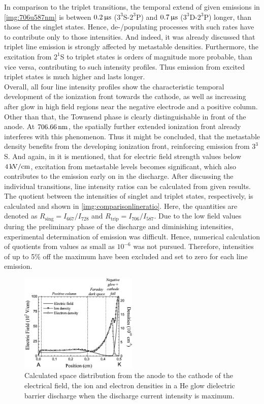 \documentclass[a4paper,10pt,twoside]{article}
\newcommand{\tenpo}[1]{ 10^{#1}}
\newcommand{\ix}[1]{_\text{#1}}
\begin{document}
		 In comparison to the triplet transitions, the temporal extend of given emissions in \autoref{img:706u587nm} is between $\unit[0.2]{\upmu s}$ ($3^3$S-$2^3$P) and $\unit[0.7]{\upmu s}$ ($3^3$D-$2^3$P) longer, than those of the singlet states. Hence, de-/populating processes with such rates have to contribute only to those intensities. And indeed, it was already discussed that triplet line emission is strongly affected by metastable densities. Furthermore, the excitation from $2^1$S to triplet states is orders of magnitude more probable, than vice versa, contributing to such intensity profiles. Thus emission from excited triplet states is much higher and lasts longer.\\
		 Overall, all four line intensity profiles show the characteristic temporal development of the ionization front towards the cathode, as well as increasing after glow in high field regions near the negative electrode and a positive column. Other than that, the Townsend phase is clearly distinguishable in front of the anode. At $\unit[706.66]{nm}$, the spatially further extended ionization front already interferes with this phenomenon. Thus it might be concluded, that the metastable density benefits from the developing ionization front, reinforcing emission from $3^3$S. And again, in \cite{linratio1_14} it is mentioned, that for electric field strength values below $\unit[4]{kV/cm}$, excitation from metastable levels becomes significant, which also contributes to the emission early on in the discharge.
		After discussing the individual transitions, line intensity ratios can be calculated from given results. The quotient between the intensities of singlet and triplet states, respectively, is calculated and shown in \autoref{img:comparisonlineratio}. Here, the quantities are denoted as $R\ix{sing}=I\ix{667}/I\ix{728}$ and $R\ix{trip}=I\ix{706}/I\ix{587}$. Due to the low field values during the preliminary phase of the discharge and diminishing intensities, experimental determination of emission was difficult. Hence, numerical calculation of quotients from values as small as $\tenpo{-6}$ was not pursued. Therefore, intensities of up to 5\% off the maximum have been excluded and set to zero for each line emission.
		
			\begin{figure}[t!]
				\centering
				\includegraphics[width=0.5\textwidth]{figures/lineratio/massinesp3fig5.pdf}
				\caption{Calculated space distribution from the anode to the cathode of	the electrical field, the ion and electron densities in a He glow dielectric barrier discharge when the discharge current intensity is maximum. \cite{Massines}}
				\label{img:massines}
			\end{figure}
			
\end{document}
